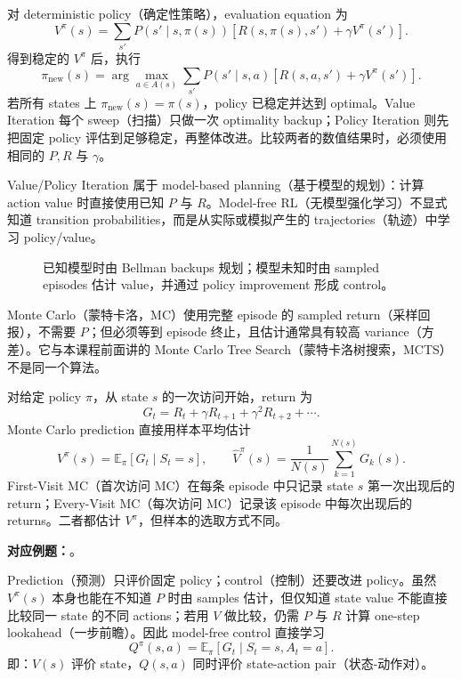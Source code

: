 对 deterministic policy（确定性策略），evaluation equation 为
\[
  V^\pi(s)=\sum_{s'}P(s'\mid s,\pi(s))
  \left[R(s,\pi(s),s')+\gamma V^\pi(s')\right].
\]
得到稳定的 $V^\pi$ 后，执行
\[
  \pi_{\mathrm{new}}(s)=\arg\max_{a\in A(s)}
  \sum_{s'}P(s'\mid s,a)
  \left[R(s,a,s')+\gamma V^\pi(s')\right].
\]
若所有 states 上 $\pi_{\mathrm{new}}(s)=\pi(s)$，policy 已稳定并达到 optimal。Value Iteration 每个 sweep（扫描）只做一次 optimality backup；Policy Iteration 则先把固定 policy 评估到足够稳定，再整体改进。比较两者的数值结果时，必须使用相同的 $P,R$ 与 $\gamma$。


Value/Policy Iteration 属于 model-based planning（基于模型的规划）：计算 action value 时直接使用已知 $P$ 与 $R$。Model-free RL（无模型强化学习）不显式知道 transition probabilities，而是从实际或模拟产生的 trajectories（轨迹）中学习 policy/value。

\begin{figure}[htbp]
  \centering
  \resizebox{0.84\textwidth}{!}{}
  \caption{已知模型时由 Bellman backups 规划；模型未知时由 sampled episodes 估计 value，并通过 policy improvement 形成 control。}
  \label{fig:sc3000-l04-planning-to-mc}
\end{figure}

Monte Carlo（蒙特卡洛，MC）使用完整 episode 的 sampled return（采样回报），不需要 $P$；但必须等到 episode 终止，且估计通常具有较高 variance（方差）。它与本课程前面讲的 Monte Carlo Tree Search（蒙特卡洛树搜索，MCTS）不是同一个算法。


对给定 policy $\pi$，从 state $s$ 的一次访问开始，return 为
\[
  G_t=R_t+\gamma R_{t+1}+\gamma^2R_{t+2}+\cdots.
\]
Monte Carlo prediction 直接用样本平均估计
\[
  V^\pi(s)=\mathbb E_\pi[G_t\mid S_t=s],
  \qquad
  \widehat V^\pi(s)=\frac{1}{N(s)}\sum_{k=1}^{N(s)}G_k(s).
\]
First-Visit MC（首次访问 MC）在每条 episode 中只记录 state $s$ 第一次出现后的 return；Every-Visit MC（每次访问 MC）记录该 episode 中每次出现后的 returns。二者都估计 $V^\pi$，但样本的选取方式不同。

\textbf{对应例题：}。


Prediction（预测）只评价固定 policy；control（控制）还要改进 policy。虽然 $V^\pi(s)$ 本身也能在不知道 $P$ 时由 samples 估计，但仅知道 state value 不能直接比较同一 state 的不同 actions；若用 $V$ 做比较，仍需 $P$ 与 $R$ 计算 one-step lookahead（一步前瞻）。因此 model-free control 直接学习
\[
  Q^\pi(s,a)=\mathbb E_\pi[G_t\mid S_t=s,A_t=a].
\]
即：$V(s)$ 评价 state，$Q(s,a)$ 同时评价 state-action pair（状态-动作对）。

